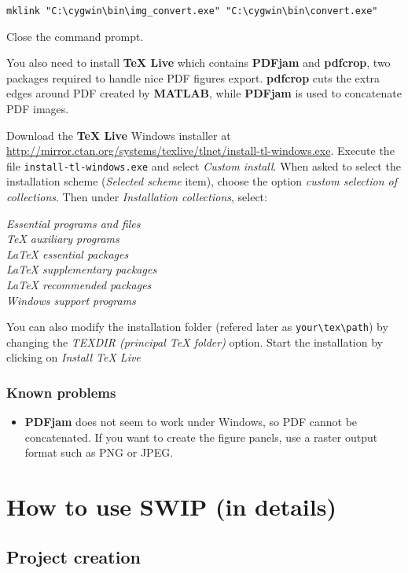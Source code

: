 \documentclass[twoside,a4paper]{article}
\def\SWIP{\textbf{SWIP}}
\def\PDFjam{\textbf{PDFjam}}
\def\pdfcrop{\textbf{pdfcrop}}
\def\MATLAB{\textbf{MATLAB}}
\begin{document}
\verb|mklink "C:\cygwin\bin\img_convert.exe" "C:\cygwin\bin\convert.exe"|

Close the command prompt.

You also need to install \textbf{TeX Live} which contains {\PDFjam} and {\pdfcrop}, two packages required to handle nice PDF figures export. {\pdfcrop} cuts the extra edges around PDF created by {\MATLAB}, while {\PDFjam} is used to concatenate PDF images.

Download the \textbf{TeX Live} Windows installer at \url{http://mirror.ctan.org/systems/texlive/tlnet/install-tl-windows.exe}. Execute the file \verb|install-tl-windows.exe| and select \textit{Custom install}. When asked to select the installation scheme (\textit{Selected scheme} item), choose the option \textit{custom selection of collections}. Then under \textit{Installation collections}, select:

\textit{Essential programs and files}\\
\textit{TeX auxiliary programs}\\
\textit{LaTeX essential packages}\\
\textit{LaTeX supplementary packages}\\
\textit{LaTeX recommended packages}\\
\textit{Windows support programs}

You can also modify the installation folder (refered later as \verb|your\tex\path|) by changing the \textit{TEXDIR (principal TeX folder)} option. Start the installation by clicking on \textit{Install TeX Live}

\subsubsection{Known problems}
\begin{itemize}
\setlength\itemsep{2ex}
\setlength{\parindent}{5ex}
\item {\PDFjam} does not seem to work under Windows, so PDF cannot be concatenated. If you want to create the figure panels, use a raster output format such as PNG or JPEG.

\end{itemize}

\clearpage
\section{How to use {\SWIP} (in details)}

\subsection{Project creation}
\end{document}
